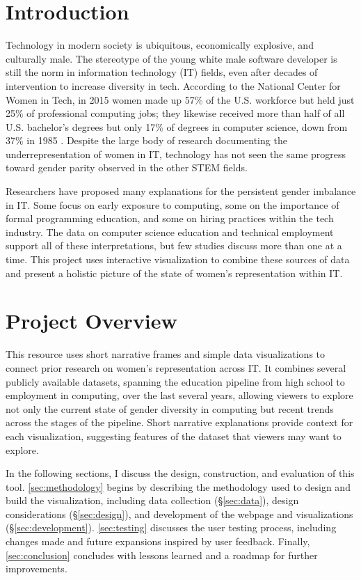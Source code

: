 \documentclass{article}
\begin{document}
\tableofcontents
\newpage

\section{Introduction}
Technology in modern society is ubiquitous, economically explosive, and culturally male. The stereotype of the young white male software developer is still the norm in information technology (IT) fields, even after decades of intervention to increase diversity in tech. According to the National Center for Women in Tech, in 2015 women made up 57\% of the U.S. workforce but held just 25\% of professional computing jobs; they likewise received more than half of all U.S. bachelor's degrees but only 17\% of degrees in computer science, down from 37\% in 1985 \citep{NCWIT2016Women}. Despite the large body of research documenting the underrepresentation of women in IT, technology has not seen the same progress toward gender parity observed in the other STEM fields.

Researchers have proposed many explanations for the persistent gender imbalance in IT\@. Some focus on early exposure to computing, some on the importance of formal programming education, and some on hiring practices within the tech industry. The data on computer science education and technical employment support all of these interpretations, but few studies discuss more than one at a time. This project uses interactive visualization to combine these sources of data and present a holistic picture of the state of women's representation within IT\@.



\section{Project Overview}
This resource uses short narrative frames and simple data visualizations to connect prior research on women's representation across IT\@. It combines several publicly available datasets, spanning the education pipeline from high school to employment in computing, over the last several years, allowing viewers to explore not only the current state of gender diversity in computing but recent trends across the stages of the pipeline. Short narrative explanations provide context for each visualization, suggesting features of the dataset that viewers may want to explore.

In the following sections, I discuss the design, construction, and evaluation of this tool. \autoref{sec:methodology} begins by describing the methodology used to design and build the visualization, including data collection (\S\ref{sec:data}), design considerations (\S\ref{sec:design}), and development of the webpage and visualizations (\S\ref{sec:development}). \autoref{sec:testing} discusses the user testing process, including changes made and future expansions inspired by user feedback. Finally, \autoref{sec:conclusion} concludes with lessons learned and a roadmap for further improvements.
\end{document}
